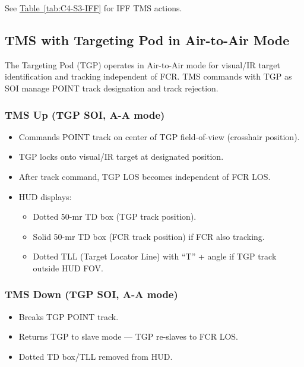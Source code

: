 \documentclass[11pt, a4paper, twoside]{report}
\newcommand{\tabref}[1]{\hyperref[#1]{Table~\ref*{#1}}}
\begin{document}
See \tabref{tab:C4-S3-IFF} for IFF TMS actions.

\subsection{TMS with Targeting Pod in Air-to-Air Mode}
\label{sec:C4-S3-S6}

The Targeting Pod (TGP) operates in Air-to-Air mode for visual/IR target 
identification and tracking independent of FCR. TMS commands with TGP as 
SOI manage POINT track designation and track rejection.

\subsubsection*{TMS Up (TGP SOI, A-A mode)}
\label{sec:C4-S3-S6-S1}

\begin{itemize}[nosep]
    \item Commands POINT track on center of TGP field-of-view (crosshair position).
    \item TGP locks onto visual/IR target at designated position.
    \item After track command, TGP LOS becomes independent of FCR LOS.
    \item HUD displays:
    \begin{itemize}[nosep]
        \item Dotted 50-mr TD box (TGP track position).
        \item Solid 50-mr TD box (FCR track position) if FCR also tracking.
        \item Dotted TLL (Target Locator Line) with ``T'' + angle if TGP track outside HUD FOV.
    \end{itemize}
\end{itemize}

\subsubsection*{TMS Down (TGP SOI, A-A mode)}
\label{sec:C4-S3-S6-S2}

\begin{itemize}[nosep]
    \item Breaks TGP POINT track.
    \item Returns TGP to slave mode --- TGP re-slaves to FCR LOS.
    \item Dotted TD box/TLL removed from HUD.
\end{itemize}
\end{document}
